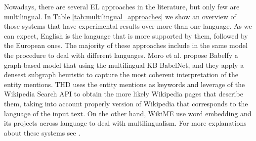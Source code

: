 \documentclass{llncs}
\begin{document}
Nowadays, there are several EL approaches in the literature, but only few are multilingual. In Table \ref{tab:multilingual_approaches} we show an overview of those systems that have experimental results over more than one language. As we can expect, English is the language that is more supported by them, followed by the European ones. The majority of these approaches include in the same model the procedure to deal with different languages. Moro et al. propose Babelfy\cite{Babelfy-moro2014entity} a graph-based model that using the multilingual KB BabelNet, and they apply a densest subgraph heuristic to capture the most coherent interpretation of the entity mentions. THD uses the entity mentions as keywords and leverage of the Wikipedia Search API to obtain the more likely Wikipedia pages that describe them, taking into account properly version of Wikipedia that corresponds to the language of the input text. On the other hand, WikiME use word embedding and its projects across language to deal with multilingualism. For more explanations about these systems see \cite{ourISWC}.
\end{document}
